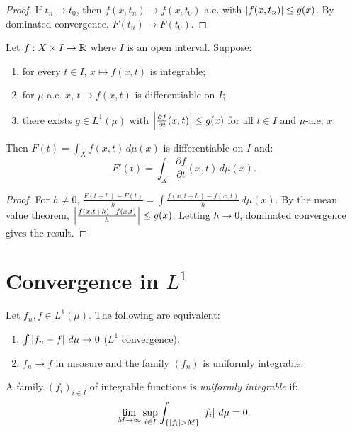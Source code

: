 \begin{proof}
If $t_n \to t_0$, then $f(x, t_n) \to f(x, t_0)$ a.e. with $\left| f(x, t_n) \right|
\leq g(x)$. By dominated convergence, $F(t_n) \to F(t_0)$.
\end{proof}

\begin{corollary}
\label{cor:differentiation_integral}
Let $f : X \times I \to \mathbb{R}$ where $I$ is an open interval. Suppose:
\begin{enumerate}
    \item for every $t \in I$, $x \mapsto f(x, t)$ is integrable;
    \item for $\mu$-a.e. $x$, $t \mapsto f(x, t)$ is differentiable on $I$;
    \item there exists $g \in L^1(\mu)$ with
    $\left| \frac{\partial f}{\partial t}(x, t) \right| \leq g(x)$ for all $t \in I$
    and $\mu$-a.e. $x$.
\end{enumerate}
Then $F(t) = \int_X f(x, t)\, d\mu(x)$ is differentiable on $I$ and:
\[
F'(t) = \int_X \frac{\partial f}{\partial t}(x, t)\, d\mu(x).
\]
\end{corollary}

\begin{proof}
For $h \neq 0$, $\frac{F(t+h) - F(t)}{h} = \int \frac{f(x, t+h) - f(x, t)}{h}
\, d\mu(x)$. By the mean value theorem,
$\left| \frac{f(x, t+h) - f(x, t)}{h} \right| \leq g(x)$. Letting $h \to 0$, dominated
convergence gives the result.
\end{proof}

\section{Convergence in $L^1$}

\begin{theorem}
Let $f_n, f \in L^1(\mu)$. The following are equivalent:
\begin{enumerate}
    \item $\int \left| f_n - f \right|\, d\mu \to 0$ ($L^1$ convergence).
    \item $f_n \to f$ in measure and the family $(f_n)$ is uniformly integrable.
\end{enumerate}
\end{theorem}

\begin{definition}
A family $(f_i)_{i \in I}$ of integrable functions is \emph{uniformly integrable}
if:
\[
\lim_{M \to \infty} \sup_{i \in I} \int_{\{\left| f_i \right| > M\}} \left| f_i \right|\, d\mu = 0.
\]
\end{definition}

